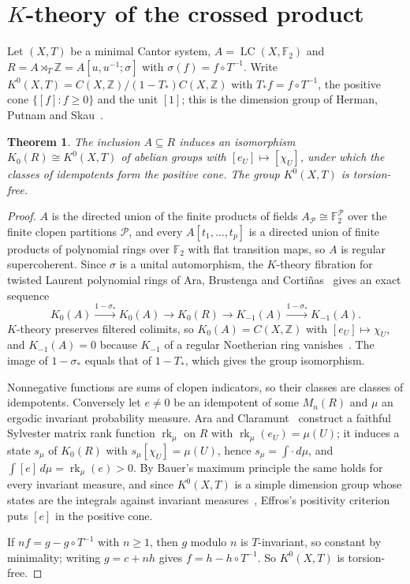 \documentclass[11pt]{amsart}
\newtheorem{theorem}{Theorem}[section]
\theoremstyle{remark}
\newcommand{\F}{\mathbb F}
\newcommand{\Z}{\mathbb Z}
\newcommand{\LC}{\operatorname{LC}}
\begin{document}
\section{$K$-theory of the crossed product}\label{sec:k}

Let $(X,T)$ be a minimal Cantor system, $A=\LC(X,\F_2)$ and
$R=A\rtimes_T\Z=A[u,u^{-1};\sigma]$ with $\sigma(f)=f\circ T^{-1}$. Write
$K^0(X,T)=C(X,\Z)/(1-T_*)C(X,\Z)$ with $T_*f=f\circ T^{-1}$, the positive
cone $\{[f]:f\ge0\}$ and the unit $[1]$; this is the dimension group of
Herman, Putnam and Skau~\cite{HPS}.

\begin{theorem}\label{thm:K}
The inclusion $A\subseteq R$ induces an isomorphism
$K_0(R)\cong K^0(X,T)$ of abelian groups with $[e_U]\mapsto[\chi_U]$, under
which the classes of idempotents form the positive cone. The group
$K^0(X,T)$ is torsion-free.
\end{theorem}

\begin{proof}
$A$ is the directed union of the finite products of fields $A_{\mathcal P}\cong\F_2^{\mathcal P}$
over the finite clopen partitions $\mathcal P$, and every $A[t_1,\dots,t_p]$
is a directed union of finite products of polynomial rings over $\F_2$ with
flat transition maps, so $A$ is regular supercoherent. Since $\sigma$ is a
unital automorphism, the $K$-theory fibration for twisted Laurent
polynomial rings of Ara, Brustenga and Corti\~nas~\cite[Theorem~3.6 and Lemma~7.2]{ABC}
gives an exact sequence
\[
  K_0(A)\xrightarrow{1-\sigma_*}K_0(A)\to K_0(R)\to K_{-1}(A)\xrightarrow{1-\sigma_*}K_{-1}(A).
\]
$K$-theory preserves filtered colimits, so $K_0(A)=C(X,\Z)$ with
$[e_U]\mapsto\chi_U$, and $K_{-1}(A)=0$ because $K_{-1}$ of a regular
Noetherian ring vanishes~\cite{Bass}. The image of $1-\sigma_*$ equals that
of $1-T_*$, which gives the group isomorphism.

Nonnegative functions are sums of clopen indicators, so their classes are
classes of idempotents. Conversely let $e\ne0$ be an idempotent of some
$M_n(R)$ and $\mu$ an ergodic invariant probability measure. Ara and
Claramunt~\cite{AraClaramunt} construct a faithful Sylvester matrix rank
function $\operatorname{rk}_\mu$ on $R$ with $\operatorname{rk}_\mu(e_U)=\mu(U)$;
it induces a state $s_\mu$ of $K_0(R)$ with $s_\mu[\chi_U]=\mu(U)$, hence
$s_\mu=\int\cdot\,d\mu$, and $\int[e]\,d\mu=\operatorname{rk}_\mu(e)>0$. By
Bauer's maximum principle the same holds for every invariant measure, and
since $K^0(X,T)$ is a simple dimension group whose states are the
integrals against invariant measures~\cite{HPS}, Effros's positivity
criterion~\cite{Effros} puts $[e]$ in the positive cone.

If $nf=g-g\circ T^{-1}$ with $n\ge1$, then $g$ modulo $n$ is $T$-invariant,
so constant by minimality; writing $g=c+nh$ gives $f=h-h\circ T^{-1}$. So
$K^0(X,T)$ is torsion-free.
\end{proof}
\end{document}
